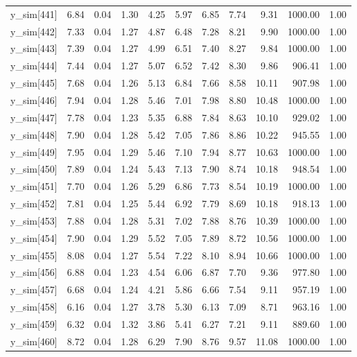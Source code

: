 \begin{table}[ht]
\begin{tabular}{rrrrrrrrrrr}
  y\_sim[441] & 6.84 & 0.04 & 1.30 & 4.25 & 5.97 & 6.85 & 7.74 & 9.31 & 1000.00 & 1.00 \\ 
  y\_sim[442] & 7.33 & 0.04 & 1.27 & 4.87 & 6.48 & 7.28 & 8.21 & 9.90 & 1000.00 & 1.00 \\ 
  y\_sim[443] & 7.39 & 0.04 & 1.27 & 4.99 & 6.51 & 7.40 & 8.27 & 9.84 & 1000.00 & 1.00 \\ 
  y\_sim[444] & 7.44 & 0.04 & 1.27 & 5.07 & 6.52 & 7.42 & 8.30 & 9.86 & 906.41 & 1.00 \\ 
  y\_sim[445] & 7.68 & 0.04 & 1.26 & 5.13 & 6.84 & 7.66 & 8.58 & 10.11 & 907.98 & 1.00 \\ 
  y\_sim[446] & 7.94 & 0.04 & 1.28 & 5.46 & 7.01 & 7.98 & 8.80 & 10.48 & 1000.00 & 1.00 \\ 
  y\_sim[447] & 7.78 & 0.04 & 1.23 & 5.35 & 6.88 & 7.84 & 8.63 & 10.10 & 929.02 & 1.00 \\ 
  y\_sim[448] & 7.90 & 0.04 & 1.28 & 5.42 & 7.05 & 7.86 & 8.86 & 10.22 & 945.55 & 1.00 \\ 
  y\_sim[449] & 7.95 & 0.04 & 1.29 & 5.46 & 7.10 & 7.94 & 8.77 & 10.63 & 1000.00 & 1.00 \\ 
  y\_sim[450] & 7.89 & 0.04 & 1.24 & 5.43 & 7.13 & 7.90 & 8.74 & 10.18 & 948.54 & 1.00 \\ 
  y\_sim[451] & 7.70 & 0.04 & 1.26 & 5.29 & 6.86 & 7.73 & 8.54 & 10.19 & 1000.00 & 1.00 \\ 
  y\_sim[452] & 7.81 & 0.04 & 1.25 & 5.44 & 6.92 & 7.79 & 8.69 & 10.18 & 918.13 & 1.00 \\ 
  y\_sim[453] & 7.88 & 0.04 & 1.28 & 5.31 & 7.02 & 7.88 & 8.76 & 10.39 & 1000.00 & 1.00 \\ 
  y\_sim[454] & 7.90 & 0.04 & 1.29 & 5.52 & 7.05 & 7.89 & 8.72 & 10.56 & 1000.00 & 1.00 \\ 
  y\_sim[455] & 8.08 & 0.04 & 1.27 & 5.54 & 7.22 & 8.10 & 8.94 & 10.66 & 1000.00 & 1.00 \\ 
  y\_sim[456] & 6.88 & 0.04 & 1.23 & 4.54 & 6.06 & 6.87 & 7.70 & 9.36 & 977.80 & 1.00 \\ 
  y\_sim[457] & 6.68 & 0.04 & 1.24 & 4.21 & 5.86 & 6.66 & 7.54 & 9.11 & 957.19 & 1.00 \\ 
  y\_sim[458] & 6.16 & 0.04 & 1.27 & 3.78 & 5.30 & 6.13 & 7.09 & 8.71 & 963.16 & 1.00 \\ 
  y\_sim[459] & 6.32 & 0.04 & 1.32 & 3.86 & 5.41 & 6.27 & 7.21 & 9.11 & 889.60 & 1.00 \\ 
  y\_sim[460] & 8.72 & 0.04 & 1.28 & 6.29 & 7.90 & 8.76 & 9.57 & 11.08 & 1000.00 & 1.00 \\ 

\end{tabular}
\end{table}
